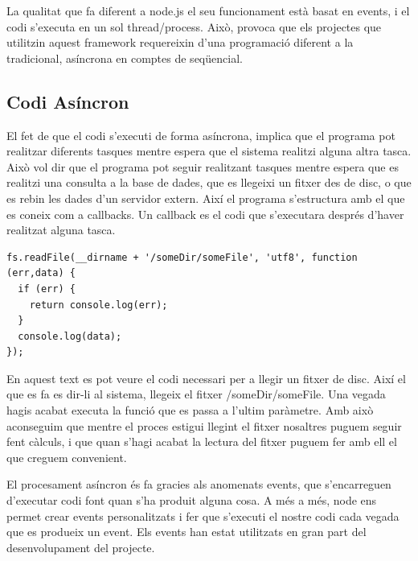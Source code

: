 La qualitat que fa diferent a node.js el seu funcionament està basat en events, i el codi s'executa en un sol thread/process. Això, provoca que els projectes que utilitzin aquest framework requereixin d'una programació diferent a la tradicional, asíncrona en comptes de seqüencial. 

\subsection{Codi Asíncron}

El fet de que el codi s'executi de forma asíncrona, implica que el programa pot realitzar diferents tasques mentre espera que el sistema realitzi alguna altra tasca. Això vol dir que el programa pot seguir realitzant tasques mentre espera que es realitzi una consulta a la base de dades, que es llegeixi un fitxer des de disc, o que es rebin les dades d'un servidor extern. Així el programa s'estructura amb el que es coneix com a callbacks. Un callback es el codi que s'executara després d'haver realitzat alguna tasca. 

\begin{verbatim}
fs.readFile(__dirname + '/someDir/someFile', 'utf8', function (err,data) {
  if (err) {
    return console.log(err);
  }
  console.log(data);
});
\end{verbatim}

En aquest text es pot veure el codi necessari per a llegir un fitxer de disc. Així el que es fa es dir-li al sistema, llegeix el fitxer /someDir/someFile. Una vegada hagis acabat executa la funció que es passa a l'ultim paràmetre. Amb això aconseguim que mentre el proces estigui llegint el fitxer nosaltres puguem seguir fent càlculs, i que quan s'hagi acabat la lectura del fitxer puguem fer amb ell el que creguem convenient. 

El procesament asíncron és fa gracies als anomenats events, que s'encarreguen d'executar codi font quan s'ha produit alguna cosa. A més a més, node ens permet crear events personalitzats i fer que s'executi el nostre codi cada vegada que es produeix un event. Els events han estat utilitzats en gran part del desenvolupament del projecte. 


